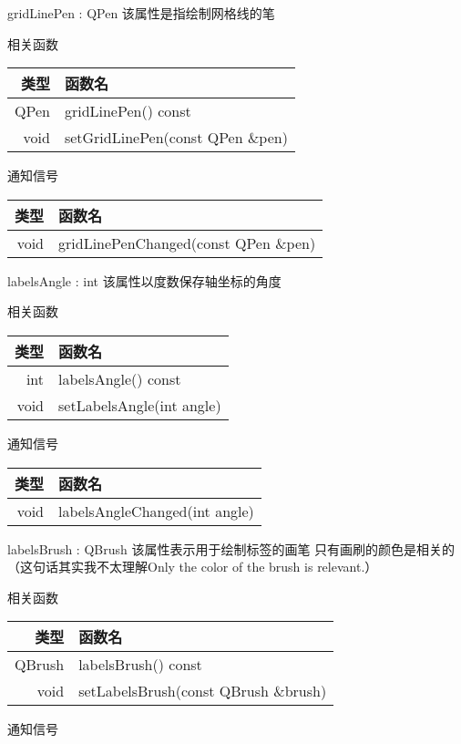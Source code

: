 \splitLine

gridLinePen : QPen 该属性是指绘制网格线的笔

相关函数

\begin{tabular}{|r|l|}
\hline
类型&函数名\\ 
\hline
QPen&	gridLinePen() const\\
\hline
void&	setGridLinePen(const QPen \&pen)\\
\hline
\end{tabular}

通知信号

\begin{tabular}{|r|l|}
\hline
类型&函数名\\ 
\hline
void	&gridLinePenChanged(const QPen \&pen)\\
\hline
\end{tabular}

\splitLine

labelsAngle : int 该属性以度数保存轴坐标的角度

相关函数

\begin{tabular}{|r|l|}
\hline
类型&函数名\\ 
\hline
int	& 	labelsAngle() const\\
\hline
void & setLabelsAngle(int angle)\\
\hline
\end{tabular}


通知信号

\begin{tabular}{|r|l|}
\hline
类型&函数名\\ 
\hline
void & labelsAngleChanged(int angle)\\
\hline
\end{tabular}

\splitLine

labelsBrush : QBrush 该属性表示用于绘制标签的画笔 只有画刷的颜色是相关的（这句话其实我不太理解Only the color of the brush is relevant.）

相关函数

\begin{tabular}{|r|l|}
\hline
类型&函数名\\ 
\hline
QBrush	&labelsBrush() const\\
\hline
void & setLabelsBrush(const QBrush \&brush)\\
\hline
\end{tabular}

通知信号

